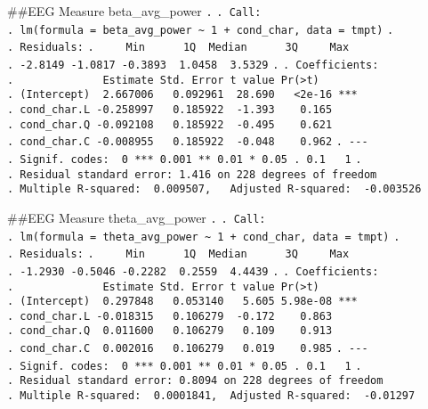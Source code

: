 \documentclass[
]{article}
\begin{document}
\#\#EEG Measure beta\_avg\_power \texttt{.} \texttt{.\ Call:}
\texttt{.\ lm(formula\ =\ beta\_avg\_power\ \textasciitilde{}\ 1\ +\ cond\_char,\ data\ =\ tmpt)}
\texttt{.} \texttt{.\ Residuals:}
\texttt{.\ \ \ \ \ Min\ \ \ \ \ \ 1Q\ \ Median\ \ \ \ \ \ 3Q\ \ \ \ \ Max}
\texttt{.\ -2.8149\ -1.0817\ -0.3893\ \ 1.0458\ \ 3.5329} \texttt{.}
\texttt{.\ Coefficients:}
\texttt{.\ \ \ \ \ \ \ \ \ \ \ \ \ \ Estimate\ Std.\ Error\ t\ value\ Pr(\textgreater{}\textbar{}t\textbar{})}
\texttt{.\ (Intercept)\ \ 2.667006\ \ \ 0.092961\ \ 28.690\ \ \ \textless{}2e-16\ ***}
\texttt{.\ cond\_char.L\ -0.258997\ \ \ 0.185922\ \ -1.393\ \ \ \ 0.165}
\texttt{.\ cond\_char.Q\ -0.092108\ \ \ 0.185922\ \ -0.495\ \ \ \ 0.621}
\texttt{.\ cond\_char.C\ -0.008955\ \ \ 0.185922\ \ -0.048\ \ \ \ 0.962}
\texttt{.\ -\/-\/-}
\texttt{.\ Signif.\ codes:\ \ 0\ \textquotesingle{}***\textquotesingle{}\ 0.001\ \textquotesingle{}**\textquotesingle{}\ 0.01\ \textquotesingle{}*\textquotesingle{}\ 0.05\ \textquotesingle{}.\textquotesingle{}\ 0.1\ \textquotesingle{}\ \textquotesingle{}\ 1}
\texttt{.}
\texttt{.\ Residual\ standard\ error:\ 1.416\ on\ 228\ degrees\ of\ freedom}
\texttt{.\ Multiple\ R-squared:\ \ 0.009507,\ \ \ Adjusted\ R-squared:\ \ -0.003526}

\#\#EEG Measure theta\_avg\_power \texttt{.} \texttt{.\ Call:}
\texttt{.\ lm(formula\ =\ theta\_avg\_power\ \textasciitilde{}\ 1\ +\ cond\_char,\ data\ =\ tmpt)}
\texttt{.} \texttt{.\ Residuals:}
\texttt{.\ \ \ \ \ Min\ \ \ \ \ \ 1Q\ \ Median\ \ \ \ \ \ 3Q\ \ \ \ \ Max}
\texttt{.\ -1.2930\ -0.5046\ -0.2282\ \ 0.2559\ \ 4.4439} \texttt{.}
\texttt{.\ Coefficients:}
\texttt{.\ \ \ \ \ \ \ \ \ \ \ \ \ \ Estimate\ Std.\ Error\ t\ value\ Pr(\textgreater{}\textbar{}t\textbar{})}
\texttt{.\ (Intercept)\ \ 0.297848\ \ \ 0.053140\ \ \ 5.605\ 5.98e-08\ ***}
\texttt{.\ cond\_char.L\ -0.018315\ \ \ 0.106279\ \ -0.172\ \ \ \ 0.863}
\texttt{.\ cond\_char.Q\ \ 0.011600\ \ \ 0.106279\ \ \ 0.109\ \ \ \ 0.913}
\texttt{.\ cond\_char.C\ \ 0.002016\ \ \ 0.106279\ \ \ 0.019\ \ \ \ 0.985}
\texttt{.\ -\/-\/-}
\texttt{.\ Signif.\ codes:\ \ 0\ \textquotesingle{}***\textquotesingle{}\ 0.001\ \textquotesingle{}**\textquotesingle{}\ 0.01\ \textquotesingle{}*\textquotesingle{}\ 0.05\ \textquotesingle{}.\textquotesingle{}\ 0.1\ \textquotesingle{}\ \textquotesingle{}\ 1}
\texttt{.}
\texttt{.\ Residual\ standard\ error:\ 0.8094\ on\ 228\ degrees\ of\ freedom}
\texttt{.\ Multiple\ R-squared:\ \ 0.0001841,\ \ Adjusted\ R-squared:\ \ -0.01297}
\end{document}
